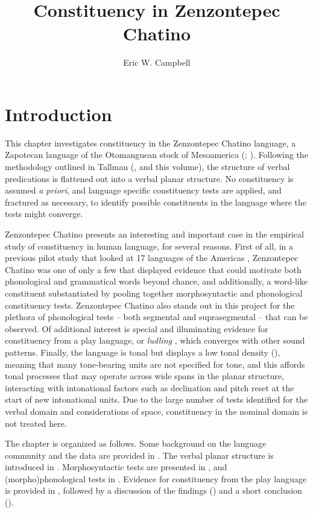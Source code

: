 \documentclass[output=paper]{langscibook}
\author{Eric W. Campbell\affiliation{University of California Santa Barbara}}
\title{Constituency in Zenzontepec Chatino}
\begin{document}
\maketitle 


\section{Introduction}
\largerpage
This chapter investigates constituency in the Zenzontepec Chatino language, a Zapotecan language of the Otomanguean stock of Mesoamerica (\citealt{Mechling1912}; \citealt{Boas1913}). Following the methodology outlined in Tallman (\citeyear{Tallman2021}, and this volume), the structure of verbal predications is flattened out into a verbal planar structure. No constituency is assumed \textit{a priori}, and language specific constituency tests are applied, and fractured as necessary, to identify possible constituents in the language where the tests might converge.

Zenzontepec Chatino presents an interesting and important case in the empirical study of constituency in human language, for several reasons. First of all, in a previous pilot study that looked at 17 languages of the Americas \citep{Tallman2019Talk}, Zenzontepec Chatino was one of only a few that displayed evidence that could motivate both phonological and grammatical words beyond chance, and additionally, a word-like constituent substantiated by pooling together morphosyntactic and phonological constituency tests. Zenzontepec Chatino also stands out in this project for the plethora of phonological tests -- both segmental and suprasegmental -- that can be observed. Of additional interest is special and illuminating evidence for constituency from a play language, or \textit{ludling} \citep{Laycock1972}, which converges with other sound patterns. Finally, the language is tonal but displays a low tonal density (\citealt{Campbell2014,Campbell2016}), meaning that many tone-bearing units are not specified for tone, and this affords tonal processes that may operate across wide spans in the planar structure, interacting with intonational factors such as declination and pitch reset at the start of new intonational units. Due to the large number of tests identified for the verbal domain and considerations of space, constituency in the nominal domain is not treated here.

The chapter is organized as follows. Some background on the language community and the data are provided in . The verbal planar structure is introduced in . Morphosyntactic tests are presented in , and (morpho)phonological tests in . Evidence for constituency from the play language is provided in , followed by a discussion of the findings () and a short conclusion ().
\end{document}
